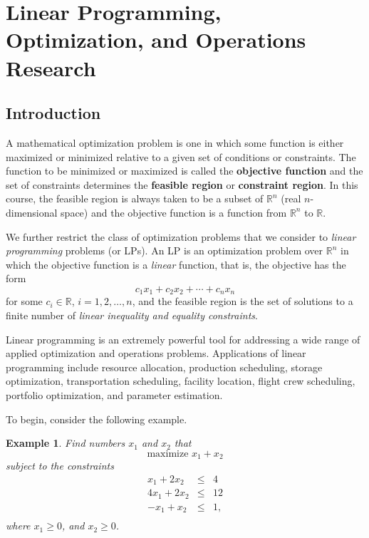 \documentclass[letterpaper,10pt]{article}
\newtheorem{exa}{Example}[section]
\begin{document}
\newpage


\section{Linear Programming, Optimization, and Operations Research}

\subsection{Introduction}

A mathematical optimization problem is one in which some function is either maximized or minimized relative to a given set of conditions or constraints. The function to be minimized or maximized is called the {\bf objective function} and the set of constraints determines the {\bf feasible region} or {\bf constraint region}. In this course, the feasible region is always taken to be a subset of $\mathbb{R}^n$ (real $n$-dimensional space) and the objective function is a function from $\mathbb{R}^n$ to $\mathbb{R}$.

We further restrict the class of optimization problems that we consider to {\em linear programming} problems (or LPs). An LP is an optimization problem over $\mathbb{R}^n$ in which the objective function is a {\em linear} function, that is, the objective has the form
$$c_1x_1 +c_2x_2 +\cdots+c_nx_n$$
for some $c_i\in\mathbb{R}$, $ i = 1,2,\ldots,n$, and the feasible region is the set of solutions to a finite number
of {\em linear inequality and equality constraints}.

Linear programming is an extremely powerful tool for addressing a wide range of applied optimization and operations problems. Applications of linear programming include resource allocation, production scheduling, storage optimization, transportation scheduling, facility location, flight crew scheduling, portfolio optimization, and parameter estimation.

To begin, consider the following example.

\begin{exa}\label{LP-Ex1}
Find numbers $x_1$ and $x_2$ that $$\text{maximize }x_1+x_2$$ subject to the constraints \begin{eqnarray*}
x_1+2x_2&\leq &4\\
4x_1+2x_2&\leq &12\\
-x_1+x_2&\leq&1,\\
\end{eqnarray*}
where $x_1\geq 0$, and $x_2\geq 0$.
\end{exa}
\end{document}

